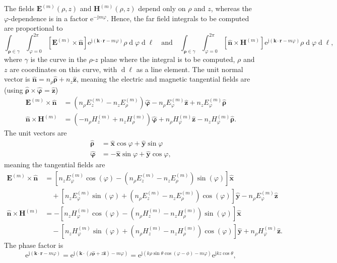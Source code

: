 \documentclass[a4paper,12pt]{article}
\renewcommand{\vec}[1]{\boldsymbol{#1}}
\newcommand{\unitvec}[1]{\hat{\vec{#1}}}
\newcommand{\mrm}[1]{\mathrm{#1}}
\newcommand{\diff}{\operatorname{d}\!}
\newcommand{\ju}{\mrm{j}}
\newcommand{\eu}{\mrm{e}}
\newcommand{\Ev}{\vec{E}}
\newcommand{\Hv}{\vec{H}}
\newcommand{\rv}{\vec{r}}
\newcommand{\kv}{\vec{k}}
\newcommand{\xuv}{\unitvec{x}}
\newcommand{\yuv}{\unitvec{y}}
\newcommand{\zuv}{\unitvec{z}}
\newcommand{\nuv}{\unitvec{n}}
\newcommand{\rhouv}{\unitvec{\rho}}
\newcommand{\varphiuv}{\unitvec{\varphi}}
\begin{document}
The fields $\Ev^{(m)}(\rho,z)$ and $\Hv^{(m)}(\rho,z)$ depend only on
$\rho$ and $z$, whereas the $\varphi$-dependence is in a factor
$\eu^{-\ju m\varphi}$. Hence, the far field integrals to be computed
are proportional to
\begin{equation}
  \int_{\vec{\rho}\in\gamma}\int_{\varphi=0}^{2\pi} [\Ev^{(m)}\times\nuv] \eu^{\ju(\kv\cdot\rv - m\varphi)} \rho\diff\varphi\diff\ell \quad\text{and}\quad \int_{\vec{\rho}\in\gamma} \int_{\varphi=0}^{2\pi} [\nuv\times\Hv^{(m)}] \eu^{\ju(\kv\cdot\rv - m\varphi)} \rho\diff\varphi\diff\ell,
\end{equation}
where $\gamma$ is the curve in the $\rho$-$z$ plane where the integral
is to be computed, $\rho$ and $z$ are coordinates on this curve, with
$\diff\ell$ as a line element.  The unit normal vector is
$\nuv = n_{\rho}\rhouv+n_{z}\zuv$, meaning the electric and magnetic
tangential fields are (using $\rhouv\times\varphiuv = \zuv$)
\begin{align}
  \Ev^{(m)}\times\nuv &= (n_{\rho}E_{z}^{(m)} - n_{z}E_{\rho}^{(m)})\varphiuv - n_{\rho}E_{\varphi}^{(m)}\zuv + n_{z}E_{\varphi}^{(m)}\rhouv \\
  \nuv\times\Hv^{(m)} &= (-n_{\rho}H_{z}^{(m)} + n_{z}H_{\rho}^{(m)})\varphiuv + n_{\rho}H_{\varphi}^{(m)}\zuv - n_{z}H_{\varphi}^{(m)}\rhouv.
\end{align}
The unit vectors are
\begin{align}
  \rhouv &= \xuv\cos\varphi + \yuv\sin\varphi \\
  \varphiuv &= -\xuv\sin\varphi+\yuv\cos\varphi,
\end{align}
meaning the tangential fields are
\begin{align}
  \Ev^{(m)}\times\nuv &= [n_{z}E_{\varphi}^{(m)}\cos(\varphi) -(n_{\rho}E_{z}^{(m)} - n_{z}E_{\rho}^{(m)})\sin(\varphi)]\xuv \\
  &\quad + [n_{z}E_{\varphi}^{(m)}\sin(\varphi) + (n_{\rho}E_{z}^{(m)} - n_{z}E_{\rho}^{(m)})\cos(\varphi)]\yuv - n_{\rho}E_{\varphi}^{(m)}\zuv \\
  \nuv\times\Hv^{(m)} &= - [n_{z}H_{\varphi}^{(m)}\cos(\varphi) - (n_{\rho}H_{z}^{(m)} - n_{z}H_{\rho}^{(m)})\sin(\varphi)]\xuv \\
  &\quad - [n_{z}H_{\varphi}^{(m)}\sin(\varphi) + (n_{\rho}H_{z}^{(m)} - n_{z}H_{\rho}^{(m)})\cos(\varphi)]\yuv + n_{\rho}H_{\varphi}^{(m)}\zuv.
\end{align}
The phase factor is
\begin{equation}
  \eu^{\ju(\kv\cdot\rv - m\varphi)} = \eu^{\ju(\kv\cdot(\rho\rhouv+z\zuv) - m\varphi)} = \eu^{\ju(k\rho\sin\theta\cos(\varphi-\phi) - m\varphi)}\eu^{\ju kz\cos\theta},
\end{equation}
\end{document}
